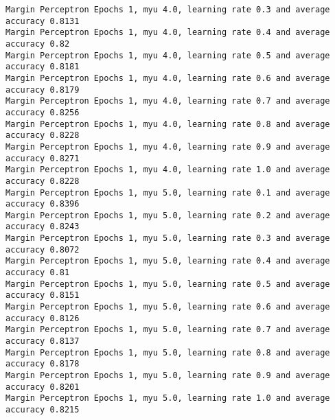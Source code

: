\begin{Verbatim}[fontsize=\small]
Margin Perceptron Epochs 1, myu 4.0, learning rate 0.3 and average accuracy 0.8131
Margin Perceptron Epochs 1, myu 4.0, learning rate 0.4 and average accuracy 0.82
Margin Perceptron Epochs 1, myu 4.0, learning rate 0.5 and average accuracy 0.8181
Margin Perceptron Epochs 1, myu 4.0, learning rate 0.6 and average accuracy 0.8179
Margin Perceptron Epochs 1, myu 4.0, learning rate 0.7 and average accuracy 0.8256
Margin Perceptron Epochs 1, myu 4.0, learning rate 0.8 and average accuracy 0.8228
Margin Perceptron Epochs 1, myu 4.0, learning rate 0.9 and average accuracy 0.8271
Margin Perceptron Epochs 1, myu 4.0, learning rate 1.0 and average accuracy 0.8228
Margin Perceptron Epochs 1, myu 5.0, learning rate 0.1 and average accuracy 0.8396
Margin Perceptron Epochs 1, myu 5.0, learning rate 0.2 and average accuracy 0.8243
Margin Perceptron Epochs 1, myu 5.0, learning rate 0.3 and average accuracy 0.8072
Margin Perceptron Epochs 1, myu 5.0, learning rate 0.4 and average accuracy 0.81
Margin Perceptron Epochs 1, myu 5.0, learning rate 0.5 and average accuracy 0.8151
Margin Perceptron Epochs 1, myu 5.0, learning rate 0.6 and average accuracy 0.8126
Margin Perceptron Epochs 1, myu 5.0, learning rate 0.7 and average accuracy 0.8137
Margin Perceptron Epochs 1, myu 5.0, learning rate 0.8 and average accuracy 0.8178
Margin Perceptron Epochs 1, myu 5.0, learning rate 0.9 and average accuracy 0.8201
Margin Perceptron Epochs 1, myu 5.0, learning rate 1.0 and average accuracy 0.8215
\end{Verbatim}

